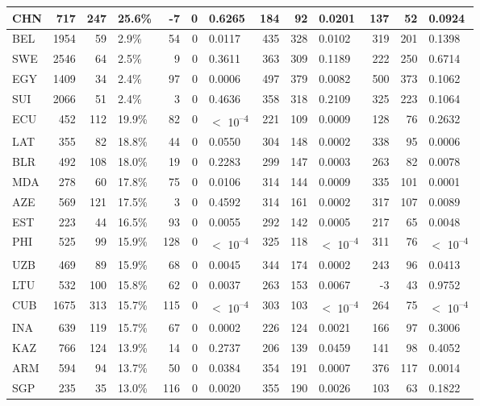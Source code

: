 \begin{tabular}{l|r|r|l|r|r|l|r|r|l|r|r|l}
\hline
CHN & 717 & 247 & 25.6\% & -7 & 0 & 0.6265 & 184 & 92 & 0.0201 & 137 & 52 & 0.0924\\
\hline
BEL & 1954 & 59 & 2.9\% & 54 & 0 & 0.0117 & 435 & 328 & 0.0102 & 319 & 201 & 0.1398\\
\hline
SWE & 2546 & 64 & 2.5\% & 9 & 0 & 0.3611 & 363 & 309 & 0.1189 & 222 & 250 & 0.6714\\
\hline
EGY & 1409 & 34 & 2.4\% & 97 & 0 & 0.0006 & 497 & 379 & 0.0082 & 500 & 373 & 0.1062\\
\hline
SUI & 2066 & 51 & 2.4\% & 3 & 0 & 0.4636 & 358 & 318 & 0.2109 & 325 & 223 & 0.1064\\
\hline
ECU & 452 & 112 & 19.9\% & 82 & 0 & $<$ 10\textsuperscript{--4} & 221 & 109 & 0.0009 & 128 & 76 & 0.2632\\
\hline
LAT & 355 & 82 & 18.8\% & 44 & 0 & 0.0550 & 304 & 148 & 0.0002 & 338 & 95 & 0.0006\\
\hline
BLR & 492 & 108 & 18.0\% & 19 & 0 & 0.2283 & 299 & 147 & 0.0003 & 263 & 82 & 0.0078\\
\hline
MDA & 278 & 60 & 17.8\% & 75 & 0 & 0.0106 & 314 & 144 & 0.0009 & 335 & 101 & 0.0001\\
\hline
AZE & 569 & 121 & 17.5\% & 3 & 0 & 0.4592 & 314 & 161 & 0.0002 & 317 & 107 & 0.0089\\
\hline
EST & 223 & 44 & 16.5\% & 93 & 0 & 0.0055 & 292 & 142 & 0.0005 & 217 & 65 & 0.0048\\
\hline
PHI & 525 & 99 & 15.9\% & 128 & 0 & $<$ 10\textsuperscript{--4} & 325 & 118 & $<$ 10\textsuperscript{--4} & 311 & 76 & $<$ 10\textsuperscript{--4}\\
\hline
UZB & 469 & 89 & 15.9\% & 68 & 0 & 0.0045 & 344 & 174 & 0.0002 & 243 & 96 & 0.0413\\
\hline
LTU & 532 & 100 & 15.8\% & 62 & 0 & 0.0037 & 263 & 153 & 0.0067 & -3 & 43 & 0.9752\\
\hline
CUB & 1675 & 313 & 15.7\% & 115 & 0 & $<$ 10\textsuperscript{--4} & 303 & 103 & $<$ 10\textsuperscript{--4} & 264 & 75 & $<$ 10\textsuperscript{--4}\\
\hline
INA & 639 & 119 & 15.7\% & 67 & 0 & 0.0002 & 226 & 124 & 0.0021 & 166 & 97 & 0.3006\\
\hline
KAZ & 766 & 124 & 13.9\% & 14 & 0 & 0.2737 & 206 & 139 & 0.0459 & 141 & 98 & 0.4052\\
\hline
ARM & 594 & 94 & 13.7\% & 50 & 0 & 0.0384 & 354 & 191 & 0.0007 & 376 & 117 & 0.0014\\
\hline
SGP & 235 & 35 & 13.0\% & 116 & 0 & 0.0020 & 355 & 190 & 0.0026 & 103 & 63 & 0.1822\\

\end{tabular}
